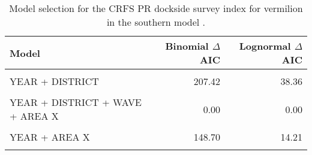 \documentclass[11pt,
  english,
  a4paper,
]{article}
\begin{document}
\begin{table}

\caption{\label{tab:tab-model-select-crfspr}Model selection for the CRFS PR dockside survey index for vermilion in the southern model .}
\centering
\begin{tabular}[t]{lrr}
\toprule
Model & Binomial $\Delta$AIC & Lognormal $\Delta$AIC\\
\midrule
\cellcolor{gray!6}{1} & \cellcolor{gray!6}{326.78} & \cellcolor{gray!6}{166.57}\\
YEAR + DISTRICT & 207.42 & 38.36\\
\cellcolor{gray!6}{YEAR + DISTRICT + WAVE} & \cellcolor{gray!6}{64.81} & \cellcolor{gray!6}{29.23}\\
YEAR + DISTRICT + WAVE + AREA X & 0.00 & 0.00\\
\cellcolor{gray!6}{YEAR + WAVE + AREA X} & \cellcolor{gray!6}{3.30} & \cellcolor{gray!6}{5.14}\\
\addlinespace
YEAR + AREA X & 148.70 & 14.21\\
\cellcolor{gray!6}{YEAR + DISTRICT + AREA X} & \cellcolor{gray!6}{143.81} & \cellcolor{gray!6}{9.35}\\
\bottomrule
\end{tabular}
\end{table}

\FloatBarrier
\end{document}
